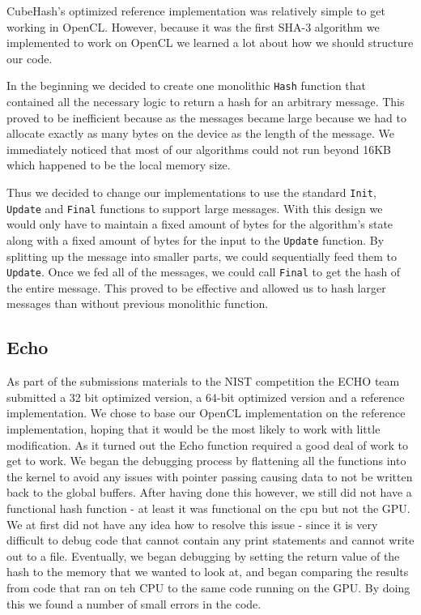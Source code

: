 CubeHash's optimized reference implementation was relatively simple to get working in OpenCL.
However, because it was the first SHA-3 algorithm we implemented to work on OpenCL we learned a lot about how we should structure our code.

In the beginning we decided to create one monolithic {\tt Hash} function that contained all the necessary logic to return a hash for an arbitrary message.
This proved to be inefficient because as the messages became large because we had to allocate exactly as many bytes on the device as the length of the message.
We immediately noticed that most of our algorithms could not run beyond 16KB which happened to be the local memory size.

Thus we decided to change our implementations to use the standard {\tt Init}, {\tt Update} and {\tt Final} functions to support large messages.
With this design we would only have to maintain a fixed amount of bytes for the algorithm's state along with a fixed amount of bytes for the input to the {\tt Update} function.
By splitting up the message into smaller parts, we could sequentially feed them to {\tt Update}.
Once we fed all of the messages, we could call {\tt Final} to get the hash of the entire message.
This proved to be effective and allowed us to hash larger messages than without previous monolithic function.

\subsection*{Echo}

As part of the submissions materials to the NIST competition the ECHO team submitted a 32 bit optimized version, a 64-bit optimized version and a reference implementation.  
We chose to base our OpenCL implementation on the reference implementation, hoping that it would be the most likely to work with little modification.
As it turned out the Echo function required a good deal of work to get to work.
We began the debugging process by flattening all the functions into the kernel to avoid any issues with pointer passing causing data to not be written back to the global buffers.
After having done this however, we still did not have a functional hash function - at least it was functional on the cpu but not the GPU.  
We at first did not have any idea how to resolve this issue - since it is very difficult to debug code that cannot contain any print statements and cannot write out to a file. 
Eventually, we began debugging by setting the return value of the hash to the memory that we wanted to look at, and began comparing the results from code that ran on teh CPU to the same code running on the GPU.
By doing this we found a number of small errors in the code.

